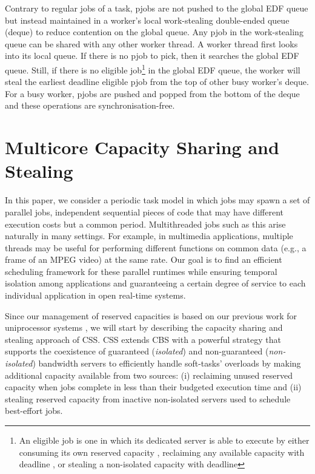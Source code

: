 \documentclass[10pt,twocolumn]{article}
\begin{document}
Contrary to regular jobs of a task, pjobs are not pushed to the global EDF queue but instead maintained in a worker's local work-stealing double-ended queue (deque) to reduce contention on the global queue. Any pjob in the work-stealing queue can be shared with any other worker thread. A worker thread first looks into its local queue. If there is no pjob to pick, then it searches the global EDF queue. Still, if there is no eligible job\footnote{An eligible job  is one in which its dedicated server  is able to execute  by either consuming its own reserved capacity , reclaiming any available capacity  with deadline , or stealing a non-isolated capacity  with deadline } in the global EDF queue, the worker will steal the earliest deadline eligible pjob from the top of other busy worker's deque. For a busy worker, pjobs are pushed and popped from the bottom of the deque and these operations are synchronisation-free.

\section{Multicore Capacity Sharing and Stealing}

In this paper, we consider a periodic task model in which jobs may spawn a set of parallel jobs, independent sequential pieces of code that may have different execution costs but a common period. Multithreaded jobs such as this arise naturally in many settings. For example, in multimedia applications, multiple threads may be useful for performing different functions on common data (e.g., a frame of an MPEG video) at the same rate. Our goal is to find an efficient scheduling framework for these parallel runtimes while ensuring temporal isolation among applications and guaranteeing a certain degree of service to each individual application in open real-time systems. 

Since our management of reserved capacities is based on our previous work for uniprocessor systems \cite{luisJSA10}, we will start by describing the capacity sharing and stealing approach of CSS. CSS extends CBS \cite{abeni98} with a powerful strategy that supports the coexistence of guaranteed (\emph{isolated}) and non-guaranteed (\emph{non-isolated}) bandwidth servers to efficiently handle soft-tasks' overloads by making additional capacity available from two sources: (i) reclaiming unused reserved capacity when jobs complete in less than their budgeted execution time and (ii) stealing reserved capacity from inactive non-isolated servers used to schedule best-effort jobs.
\end{document}
